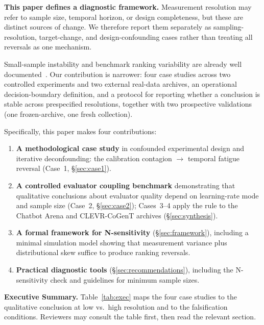 \documentclass[11pt]{article}
\begin{document}
\textbf{This paper defines a diagnostic framework.} Measurement resolution may refer to sample size, temporal horizon, or design completeness, but these are distinct sources of change. We therefore report them separately as sampling-resolution, target-change, and design-confounding cases rather than treating all reversals as one mechanism.

Small-sample instability and benchmark ranking variability are already well documented~\cite{ioannidis2005most,button2013power,dodge2019reproducibility,sclar2024quantifying}. Our contribution is narrower: four case studies across two controlled experiments and two external real-data archives, an operational decision-boundary definition, and a protocol for reporting whether a conclusion is stable across prespecified resolutions, together with two prospective validations (one frozen-archive, one fresh collection).

Specifically, this paper makes four contributions:
\begin{enumerate}[leftmargin=*,nosep]
    \item \textbf{A methodological case study} in confounded experimental design and iterative deconfounding: the calibration contagion $\to$ temporal fatigue reversal (Case~1, \S\ref{sec:case1}).
    \item \textbf{A controlled evaluator coupling benchmark} demonstrating that qualitative conclusions about evaluator quality depend on learning-rate mode and sample size (Case~2, \S\ref{sec:case2}); Cases~3--4 apply the rule to the Chatbot Arena and CLEVR-CoGenT archives (\S\ref{sec:synthesis}).
    \item \textbf{A formal framework for N-sensitivity} (\S\ref{sec:framework}), including a minimal simulation model showing that measurement variance plus distributional skew suffice to produce ranking reversals.
    \item \textbf{Practical diagnostic tools} (\S\ref{sec:recommendations}), including the N-sensitivity check and guidelines for minimum sample sizes.
\end{enumerate}

\noindent\textbf{Executive Summary.} Table~\ref{tab:exec} maps the four case studies to the qualitative conclusion at low vs.\ high resolution and to the falsification conditions. Reviewers may consult the table first, then read the relevant section.
\end{document}

